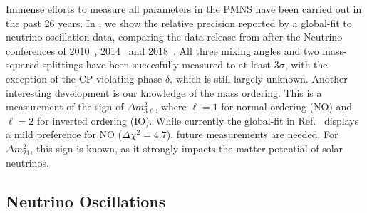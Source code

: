 Immense efforts to measure all parameters in the PMNS have been carried out in the past 26 years. In , we show the relative precision reported by a global-fit to neutrino oscillation data, comparing the data release from after the Neutrino conferences of 2010~\cite{Schwetz:2011qt}, 2014~\cite{Gonzalez-Garcia:2014bfa} and 2018~\cite{Esteban:2018azc}. All three mixing angles and two mass-squared splittings have been succesfully measured to at least $3\sigma$, with the exception of the CP-violating phase $\delta$, which is still largely unknown. Another interesting development is our knowledge of the mass ordering. This is a measurement of the sign of $\Delta m^2_{3\ell}$, where $\ell = 1$ for normal ordering (NO) and $\ell = 2$ for inverted ordering (IO). While currently the global-fit in Ref.~\cite{Esteban:2018azc} displays a mild preference for NO ($\Delta \chi^2 = 4.7$), future measurements are needed. For $\Delta m^2_{21}$, this sign is known, as it strongly impacts the matter potential of solar neutrinos.


\subsection{Neutrino Oscillations}

